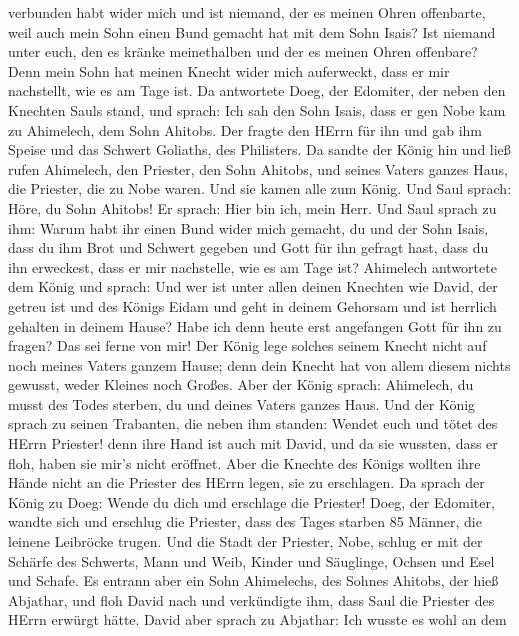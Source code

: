 verbunden habt wider mich und ist niemand, der es meinen Ohren
offenbarte, weil auch mein Sohn einen Bund gemacht hat mit dem Sohn
Isais? Ist niemand unter euch, den es kränke meinethalben und der es
meinen Ohren offenbare? Denn mein Sohn hat meinen Knecht wider mich
auferweckt, dass er mir nachstellt, wie es am Tage ist.  Da
antwortete Doeg, der Edomiter, der neben den Knechten Sauls stand, und
sprach: Ich sah den Sohn Isais, dass er gen Nobe kam zu Ahimelech, dem
Sohn Ahitobs.  Der fragte den HErrn für ihn und gab ihm
Speise und das Schwert Goliaths, des Philisters.  Da sandte
der König hin und ließ rufen Ahimelech, den Priester, den Sohn Ahitobs,
und seines Vaters ganzes Haus, die Priester, die zu Nobe waren. Und sie
kamen alle zum König.  Und Saul sprach: Höre, du Sohn
Ahitobs! Er sprach: Hier bin ich, mein Herr.  Und Saul
sprach zu ihm: Warum habt ihr einen Bund wider mich gemacht, du und der
Sohn Isais, dass du ihm Brot und Schwert gegeben und Gott für ihn
gefragt hast, dass du ihn erweckest, dass er mir nachstelle, wie es am
Tage ist?  Ahimelech antwortete dem König und sprach: Und
wer ist unter allen deinen Knechten wie David, der getreu ist und des
Königs Eidam und geht in deinem Gehorsam und ist herrlich gehalten in
deinem Hause?  Habe ich denn heute erst angefangen Gott für
ihn zu fragen? Das sei ferne von mir! Der König lege solches seinem
Knecht nicht auf noch meines Vaters ganzem Hause; denn dein Knecht hat
von allem diesem nichts gewusst, weder Kleines noch Großes.
 Aber der König sprach: Ahimelech, du musst des Todes
sterben, du und deines Vaters ganzes Haus.  Und der König
sprach zu seinen Trabanten, die neben ihm standen: Wendet euch und tötet
des HErrn Priester! denn ihre Hand ist auch mit David, und da sie
wussten, dass er floh, haben sie mir's nicht eröffnet. Aber die Knechte
des Königs wollten ihre Hände nicht an die Priester des HErrn legen, sie
zu erschlagen.  Da sprach der König zu Doeg: Wende du dich
und erschlage die Priester! Doeg, der Edomiter, wandte sich und erschlug
die Priester, dass des Tages starben 85 Männer, die leinene Leibröcke
trugen.  Und die Stadt der Priester, Nobe, schlug er mit
der Schärfe des Schwerts, Mann und Weib, Kinder und Säuglinge, Ochsen
und Esel und Schafe.  Es entrann aber ein Sohn Ahimelechs,
des Sohnes Ahitobs, der hieß Abjathar, und floh David nach 
und verkündigte ihm, dass Saul die Priester des HErrn erwürgt hätte.
 David aber sprach zu Abjathar: Ich wusste es wohl an dem
